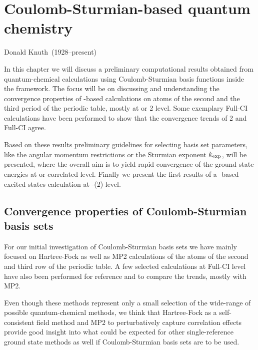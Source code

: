 \chapter{Coulomb-Sturmian-based quantum chemistry}
\label{ch:CSQChem}
{Donald Knuth~(1928--present)}

\noindent
In this chapter we will discuss a preliminary computational results
obtained from quantum-chemical calculations using Coulomb-Sturmian
basis functions inside the \molsturm framework.
The focus will be on discussing and understanding the convergence
properties of \CS-based calculations on atoms of
the second and the third period of the periodic table,
mostly at \HF or {\MP}2 level.
Some exemplary Full-CI calculations have been performed
to show that the convergence trends of {\MP}2 and Full-CI agree.

Based on these results preliminary guidelines for selecting
\CS basis set parameters,
like the angular momentum restrictions or the Sturmian exponent $k_\text{exp}$,
will be presented,
where the overall aim is to yield rapid convergence
of the ground state energies at \HF or correlated level.
Finally we present the first results of a \CS-based
excited states calculation at \ADC-(2) level.

\section{Convergence properties of Coulomb-Sturmian basis sets}
For our initial investigation of Coulomb-Sturmian basis sets
we have mainly focused on Hartree-Fock as well as MP2
calculations of the atoms of the second and third
row of the periodic table.
A few selected calculations at Full-CI level have also
been performed for reference and to compare the trends,
mostly with MP2.

Even though these methods represent only a small selection
of the wide-range of possible quantum-chemical methods,
we think that Hartree-Fock as a self-consistent field method
and MP2 to perturbatively capture correlation effects
provide good insight into what could be expected
for other single-reference ground state methods as well
if Coulomb-Sturmian basis sets are to be used.

